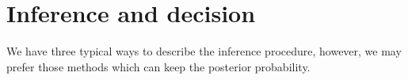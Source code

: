 \documentclass{article}
\begin{document}
\section{Inference and decision}
We have three typical ways to describe the inference procedure, however, we may prefer those methods which can keep the posterior probability.







\appendix
\end{document}
